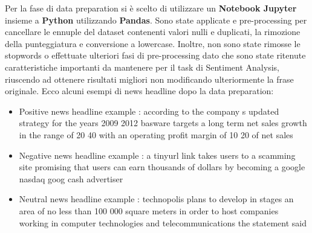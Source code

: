 Per la fase di data preparation si è scelto di utilizzare un \textbf{Notebook Jupyter} insieme a \textbf{Python} utilizzando \textbf{Pandas}.
Sono state applicate  e  pre-processing per cancellare le ennuple del dataset contenenti valori nulli e duplicati, la rimozione della punteggiatura e conversione a lowercase. Inoltre, non sono state rimosse le stopwords o effettuate ulteriori fasi di pre-processing dato che sono state ritenute caratteristiche importanti da mantenere per il task di Sentiment Analysis, riuscendo ad ottenere risultati migliori non modificando ulteriormente la frase originale.
Ecco alcuni esempi di news headline dopo la data preparation:
\begin{itemize}
    \item \label{label:1}Positive news headline example : according to the company  s updated strategy for the years 2009 2012   basware targets a long term net sales growth in the range of 20    40   with an operating profit margin of 10    20   of net sales
    \item \label{label:2}Negative news headline example : a tinyurl link takes users to a scamming site promising that users can earn thousands of dollars by becoming a google   nasdaq   goog   cash advertiser
    \item \label{label:3}Neutral news headline example  : technopolis plans to develop in stages an area of no less than 100 000 square meters in order to host companies working in computer technologies and telecommunications   the statement said
\end{itemize}
